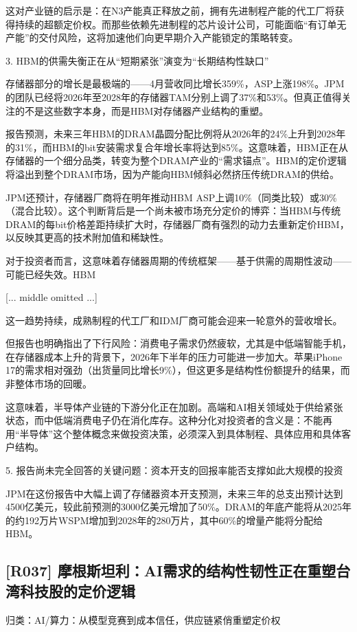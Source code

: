 \documentclass[11pt]{ctexart}
\begin{document}
这对产业链的启示是：在N3产能真正释放之前，拥有先进制程产能的代工厂将获得持续的超额定价权。而那些依赖先进制程的芯片设计公司，可能面临“有订单无产能”的交付风险，这将加速他们向更早期介入产能锁定的策略转变。

3. HBM的供需失衡正在从“短期紧张”演变为“长期结构性缺口”

存储器部分的增长是最极端的——4月营收同比增长359\%，ASP上涨198\%。JPM的团队已经将2026年至2028年的存储器TAM分别上调了37\%和53\%。但真正值得关注的不是这些数字本身，而是HBM对存储器产业结构的重塑。

报告预测，未来三年HBM的DRAM晶圆分配比例将从2026年的24\%上升到2028年的31\%，而HBM的bit安装需求复合年增长率将达到85\%。这意味着，HBM正在从存储器的一个细分品类，转变为整个DRAM产业的“需求锚点”。HBM的定价逻辑将溢出到整个DRAM市场，因为产能向HBM倾斜必然挤压传统DRAM的供给。

JPM还预计，存储器厂商将在明年推动HBM ASP上调10\%（同类比较）或30\%（混合比较）。这个判断背后是一个尚未被市场充分定价的博弈：当HBM与传统DRAM的每bit价格差距持续扩大时，存储器厂商有强烈的动力去重新定价HBM，以反映其更高的技术附加值和稀缺性。

对于投资者而言，这意味着存储器周期的传统框架——基于供需的周期性波动——可能已经失效。HBM

[... middle omitted ...]

这一趋势持续，成熟制程的代工厂和IDM厂商可能会迎来一轮意外的营收增长。

但报告也明确指出了下行风险：消费电子需求仍然疲软，尤其是中低端智能手机，在存储器成本上升的背景下，2026年下半年的压力可能进一步加大。苹果iPhone 17的需求相对强劲（出货量同比增长9\%），但这更多是结构性份额提升的结果，而非整体市场的回暖。

这意味着，半导体产业链的下游分化正在加剧。高端和AI相关领域处于供给紧张状态，而中低端消费电子仍在消化库存。这种分化对投资者的含义是：不能再用“半导体”这个整体概念来做投资决策，必须深入到具体制程、具体应用和具体客户结构。

5. 报告尚未完全回答的关键问题：资本开支的回报率能否支撑如此大规模的投资

JPM在这份报告中大幅上调了存储器资本开支预测，未来三年的总支出预计达到4500亿美元，较此前预测的3000亿美元增加了50\%。DRAM的年底产能将从2025年的约192万片WSPM增加到2028年的280万片，其中60\%的增量产能将分配给HBM。

\subsection{[R037] 摩根斯坦利：AI需求的结构性韧性正在重塑台湾科技股的定价逻辑}
{\small\color{refgray}归类：AI/算力：从模型竞赛到成本信任，供应链紧俏重塑定价权}
\end{document}
